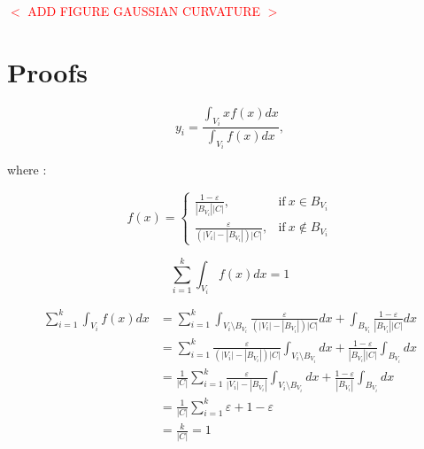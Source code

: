 \documentclass[11pt,fleqn]{book} %
\newcommand{\arnaud}[1]{\textcolor{red}{$<$ #1 $>$}}
\begin{document}
\begin{appendices}
\arnaud{ADD FIGURE GAUSSIAN CURVATURE}

\section{Proofs}

\begin{equation}
	y_i = \frac{\int_{V_i}xf(x)dx}{\int_{V_i}f(x)dx},
\end{equation}

where : 

\begin{equation}
	f(x) = 
    \begin{cases}
      \frac{1-\varepsilon}{|B_{V_i}||C|}, & \text{if}\ x \in B_{V_i} \\
      \frac{\varepsilon}{(|V_i|-|B_{V_i}|)|C|}, & \text{if}\ x \not\in B_{V_i}
    \end{cases}
\end{equation}

\begin{equation}
	\sum_{i=1}^k \int_{V_i}f(x)dx = 1
\end{equation}

\begin{align*}
	\sum_{i=1}^k \int_{V_i}f(x)dx 
	&= \sum_{i=1}^k \int_{V_i \setminus B_{V_i}}\frac{\varepsilon}{(|V_i|-|B_{V_i}|)|C|}dx + \int_{B_{V_i}}\frac{1-\varepsilon}{|B_{V_i}||C|}dx \\
	&= \sum_{i=1}^k \frac{\varepsilon}{(|V_i|-|B_{V_i}|)|C|}\int_{V_i \setminus B_{V_i}}dx + \frac{1-\varepsilon}{|B_{V_i}||C|}\int_{B_{V_i}}dx \\
	&= \frac{1}{|C|} \sum_{i=1}^k \frac{\varepsilon}{|V_i|-|B_{V_i}|}\int_{V_i \setminus B_{V_i}}dx + \frac{1-\varepsilon}{|B_{V_i}|}\int_{B_{V_i}}dx \\
	&= \frac{1}{|C|} \sum_{i=1}^k \varepsilon + 1 - \varepsilon\\
	&= \frac{k}{|C|} = 1
\end{align*}

\end{appendices}

\end{document}
